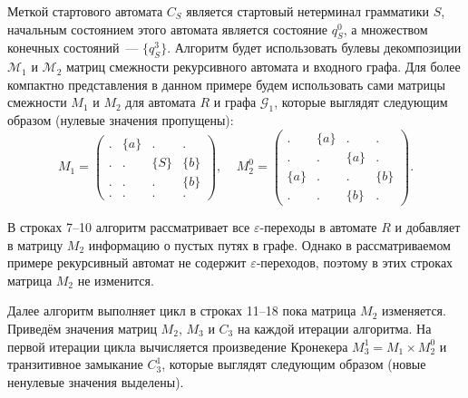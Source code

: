 Меткой стартового автомата $C_S$ является стартовый нетерминал грамматики $S$, начальным состоянием этого автомата является состояние $q_S^0$, а множеством конечных состояний~--- $\{ q_S^3 \}$. Алгоритм будет использовать булевы декомпозиции $\mathcal{M}_1$ и $\mathcal{M}_2$ матриц смежности рекурсивного автомата и входного графа. Для более компактно представления в данном примере будем использовать сами матрицы смежности $M_1$ и $M_2$ для автомата $R$ и графа $\mathcal{G}_1$, которые выглядят следующим образом (нулевые значения пропущены):
    $$
    M_1 =
    \begin{pmatrix}
    . & \{a\} & . & .     \\
    . & . & \{S\} & \{b\} \\
    . & . & . & \{b\}     \\
    . & . & . & .
    \end{pmatrix}
    ,~~~~~
    M_2^0 =
    \begin{pmatrix}
    . & \{a\} & . & .     \\
    . & . & \{a\} & .     \\
    \{a\} & . & . & \{b\} \\
    . & . & \{b\} & .
    \end{pmatrix}.
    $$ 

В строках 7--10 алгоритм рассматривает все $\varepsilon$-переходы в автомате $R$ и добавляет в матрицу $M_2$ информацию о пустых путях в графе. Однако в рассматриваемом примере рекурсивный автомат не содержит $\varepsilon$-переходов, поэтому в этих строках матрица $M_2$ не изменится.

Далее алгоритм выполняет цикл в строках 11--18 пока матрица $M_2$ изменяется. Приведём значения матриц $M_2$, $M_3$ и $C_3$ на каждой итерации алгоритма. На первой итерации цикла вычисляется произведение Кронекера $M_3^1 = M_1 \times M_2^0$ и транзитивное замыкание $C_3^1$, которые выглядят следующим образом (новые ненулевые значения выделены).

